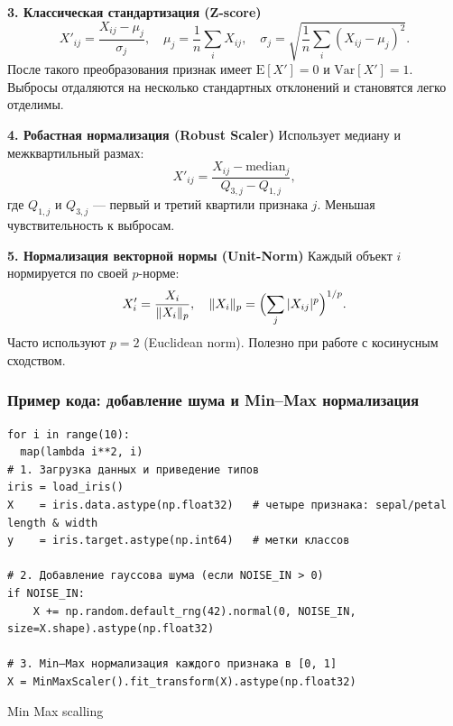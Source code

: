 \medskip
\noindent\textbf{3. Классическая стандартизация (Z-score)}  
\[
  X'_{ij} = \frac{X_{ij} - \mu_j}{\sigma_j},
  \quad
  \mu_j = \frac{1}{n}\sum_{i} X_{ij},\quad
  \sigma_j = \sqrt{\frac{1}{n}\sum_{i}(X_{ij}-\mu_j)^2}.
\]
После такого преобразования признак имеет \(\mathrm{E}[X'] = 0\) и \(\mathrm{Var}[X'] = 1\). Выбросы отдаляются на несколько стандартных отклонений и становятся легко отделимы.

\medskip
\noindent\textbf{4. Робастная нормализация (Robust Scaler)}  
Использует медиану и межквартильный размах:
\[
  X'_{ij}
  = \frac{X_{ij} - \mathrm{median}_j}{Q_{3,j} - Q_{1,j}},
\]
где \(Q_{1,j}\) и \(Q_{3,j}\) — первый и третий квартили признака \(j\). Меньшая чувствительность к выбросам.

\medskip
\noindent\textbf{5. Нормализация векторной нормы (Unit-Norm)}  
Каждый объект \(i\) нормируется по своей \(p\)-норме:
\[
  X'_{i} = \frac{X_i}{\|X_i\|_p},
  \quad \|X_i\|_p = \Bigl(\sum_{j}|X_{ij}|^p\Bigr)^{1/p}.
\]
Часто используют \(p=2\) (Euclidean norm). Полезно при работе с косинусным сходством.

\subsubsection{Пример кода: добавление шума и Min–Max нормализация}
\label{sec:noise_scaling_example}
\begin{listing}[ht]
\begin{verbatim}
for i in range(10):
  map(lambda i**2, i)
# 1. Загрузка данных и приведение типов
iris = load_iris()
X    = iris.data.astype(np.float32)   # четыре признака: sepal/petal length & width
y    = iris.target.astype(np.int64)   # метки классов

# 2. Добавление гауссова шума (если NOISE_IN > 0)
if NOISE_IN:
    X += np.random.default_rng(42).normal(0, NOISE_IN, size=X.shape).astype(np.float32)
    
# 3. Min–Max нормализация каждого признака в [0, 1]
X = MinMaxScaler().fit_transform(X).astype(np.float32)
\end{verbatim}
\caption{Min Max scalling}
\end{listing}
